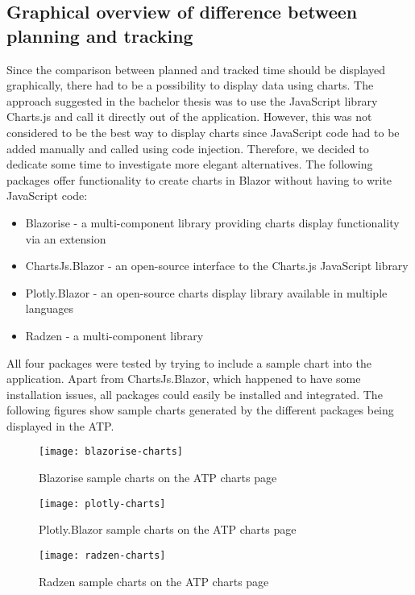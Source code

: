 \subsection{Graphical overview of difference between planning and tracking} \label{Charts}
Since the comparison between planned and tracked time should be displayed graphically, there had to be a possibility to display data using charts. The approach suggested in the bachelor thesis was to use the JavaScript library Charts.js and call it directly out of the application. However, this was not considered to be the best way to display charts since JavaScript code had to be added manually and called using code injection. Therefore, we decided to dedicate some time to investigate more elegant alternatives. The following packages offer functionality to create charts in Blazor without having to write JavaScript code:
\begin{itemize}
	\item Blazorise \cite{blazorise-url} - a multi-component library providing charts display functionality via an extension
	\item ChartsJs.Blazor \cite{chartsjs.blazor-url} - an open-source interface to the Charts.js JavaScript library
	\item Plotly.Blazor \cite{plotly-url} - an open-source charts display library available in multiple languages
	\item Radzen \cite{radzen-url} - a multi-component library
\end{itemize}
All four packages were tested by trying to include a sample chart into the application. Apart from ChartsJs.Blazor, which happened to have some installation issues, all packages could easily be installed and integrated. The following figures show sample charts generated by the different packages being displayed in the ATP.

\begin{figure}[H]
	\centering
	\texttt{[image: blazorise-charts]}
	\caption{Blazorise sample charts on the ATP charts page}
	\label{blazorise}
\end{figure}

\begin{figure}[H]
	\centering
	\texttt{[image: plotly-charts]}
	\caption{Plotly.Blazor sample charts on the ATP charts page}
	\label{plotly}
\end{figure}

\begin{figure}[H]
	\centering
	\texttt{[image: radzen-charts]}
	\caption{Radzen sample charts on the ATP charts page}
	\label{radzen}
\end{figure}


